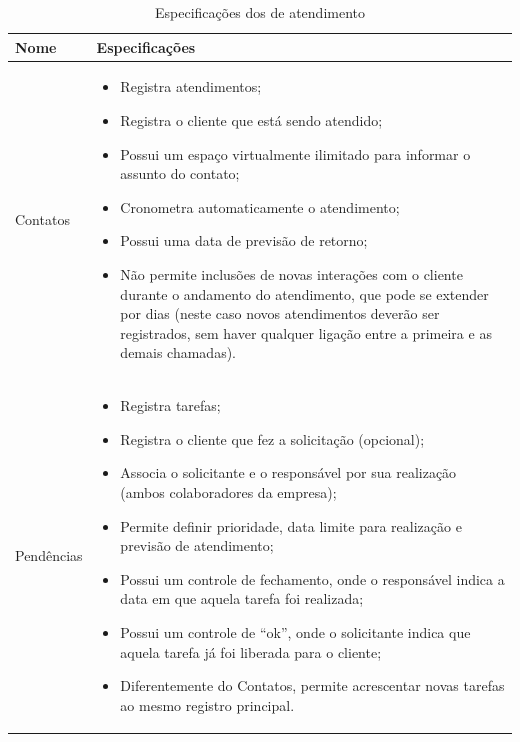 \begin{table}[h!]\footnotesize
\centering
\begin{tabular}
{
 	|p{}|p{12cm}|
}

	\hline
	\textbf{Nome}&
	\textbf{Especificações}\\
	\hline

	Contatos&
	\begin{itemize}
	\item Registra atendimentos;
	\item Registra o cliente que está sendo atendido;
	\item Possui um espaço virtualmente ilimitado para informar o assunto do contato;
	\item Cronometra automaticamente o atendimento;
	\item Possui uma data de previsão de retorno;
	\item Não permite inclusões de novas interações com o cliente durante o andamento do atendimento, que pode se extender por dias (neste caso novos atendimentos deverão ser registrados, sem haver qualquer ligação entre a primeira e as demais chamadas).
	\end{itemize}\\
	\hline

	Pendências&
	\begin{itemize}
	\item Registra tarefas;
	\item Registra o cliente que fez a solicitação (opcional);
	\item Associa o solicitante e o responsável por sua realização (ambos colaboradores da empresa);
	\item Permite definir prioridade, data limite para realização e previsão de atendimento;
	\item Possui um controle de fechamento, onde o responsável indica a data em que aquela tarefa foi realizada;
	\item Possui um controle de ``ok'', onde o solicitante indica que aquela tarefa já foi liberada para o cliente;
	\item Diferentemente do Contatos, permite acrescentar novas tarefas ao mesmo registro principal.
	\end{itemize}\\
	\hline
	
\end{tabular}
\caption {Especificações dos \sws de atendimento}
\label{Tab:espec:sw:atend}
\end{table}

